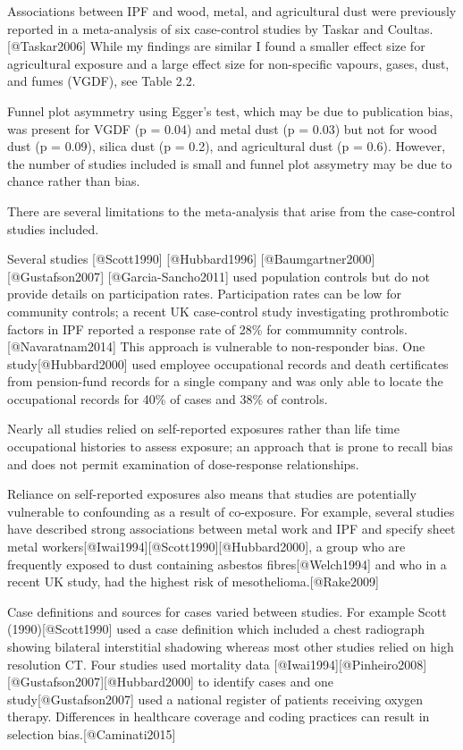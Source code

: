 \documentclass[
]{article}
\begin{document}
Associations between IPF and wood, metal, and agricultural dust were
previously reported in a meta-analysis of six case-control studies by
Taskar and Coultas. {[}@Taskar2006{]} While my findings are similar I
found a smaller effect size for agricultural exposure and a large effect
size for non-specific vapours, gases, dust, and fumes (VGDF), see Table
2.2.

Funnel plot asymmetry using Egger's test, which may be due to
publication bias, was present for VGDF (p = 0.04) and metal dust (p =
0.03) but not for wood dust (p = 0.09), silica dust (p = 0.2), and
agricultural dust (p = 0.6). However, the number of studies included is
small and funnel plot assymetry may be due to chance rather than bias.

There are several limitations to the meta-analysis that arise from the
case-control studies included.

Several studies {[}@Scott1990{]} {[}@Hubbard1996{]}
{[}@Baumgartner2000{]} {[}@Gustafson2007{]} {[}@Garcia-Sancho2011{]}
used population controls but do not provide details on participation
rates. Participation rates can be low for community controls; a recent
UK case-control study investigating prothrombotic factors in IPF
reported a response rate of 28\% for commumnity controls.
{[}@Navaratnam2014{]} This approach is vulnerable to non-responder bias.
One study{[}@Hubbard2000{]} used employee occupational records and death
certificates from pension-fund records for a single company and was only
able to locate the occupational records for 40\% of cases and 38\% of
controls.

Nearly all studies relied on self-reported exposures rather than life
time occupational histories to assess exposure; an approach that is
prone to recall bias and does not permit examination of dose-response
relationships.

Reliance on self-reported exposures also means that studies are
potentially vulnerable to confounding as a result of co-exposure. For
example, several studies have described strong associations between
metal work and IPF and specify sheet metal
workers{[}@Iwai1994{]}{[}@Scott1990{]}{[}@Hubbard2000{]}, a group who
are frequently exposed to dust containing asbestos
fibres{[}@Welch1994{]} and who in a recent UK study, had the highest
risk of mesothelioma.{[}@Rake2009{]}

Case definitions and sources for cases varied between studies. For
example Scott (1990){[}@Scott1990{]} used a case definition which
included a chest radiograph showing bilateral interstitial shadowing
whereas most other studies relied on high resolution CT. Four studies
used mortality data
{[}@Iwai1994{]}{[}@Pinheiro2008{]}{[}@Gustafson2007{]}{[}@Hubbard2000{]}
to identify cases and one study{[}@Gustafson2007{]} used a national
register of patients receiving oxygen therapy. Differences in healthcare
coverage and coding practices can result in selection
bias.{[}@Caminati2015{]}
\end{document}
